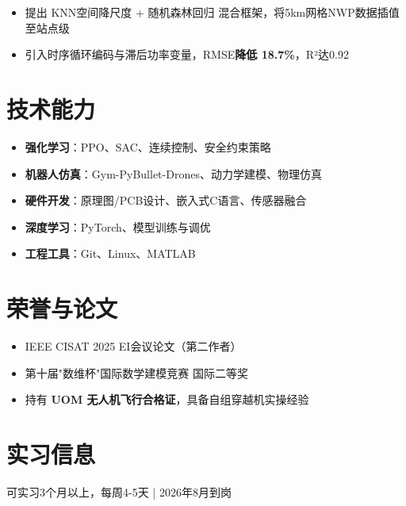 \documentclass{resume}
\begin{document}
\begin{itemize}
  \item 提出 KNN空间降尺度 + 随机森林回归 混合框架，将5km网格NWP数据插值至站点级
  \item 引入时序循环编码与滞后功率变量，RMSE\textbf{降低 18.7\%}，R²达0.92
\end{itemize}

\section{技术能力}
\begin{itemize}
  \item \textbf{强化学习}：PPO、SAC、连续控制、安全约束策略
  \item \textbf{机器人仿真}：Gym-PyBullet-Drones、动力学建模、物理仿真
  \item \textbf{硬件开发}：原理图/PCB设计、嵌入式C语言、传感器融合
  \item \textbf{深度学习}：PyTorch、模型训练与调优
  \item \textbf{工程工具}：Git、Linux、MATLAB
\end{itemize}

\section{荣誉与论文}
\begin{itemize}
  \item IEEE CISAT 2025 EI会议论文（第二作者）
  \item 第十届"数维杯"国际数学建模竞赛 国际二等奖
  \item 持有 \textbf{UOM 无人机飞行合格证}，具备自组穿越机实操经验
\end{itemize}

\section{实习信息}
可实习3个月以上，每周4-5天 | 2026年8月到岗
\end{document}
